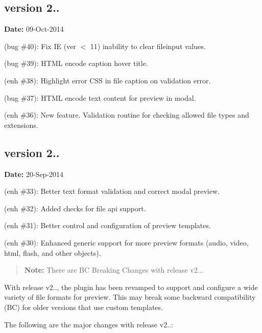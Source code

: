 \subsection*{version 2..}

{\bfseries Date\+:} 09-\/\+Oct-\/2014


\begin{DoxyItemize}
\item (bug \#40)\+: Fix IE (ver $<$ 11) inability to clear fileinput values.
\item (bug \#39)\+: H\+T\+ML encode caption hover title.
\item (enh \#38)\+: Highlight error C\+SS in file caption on validation error.
\item (bug \#37)\+: H\+T\+ML encode text content for preview in modal.
\item (enh \#36)\+: New feature. Validation routine for checking allowed file types and extensions.
\end{DoxyItemize}

\subsection*{version 2..}

{\bfseries Date\+:} 20-\/\+Sep-\/2014


\begin{DoxyItemize}
\item (enh \#33)\+: Better text format validation and correct modal preview.
\item (enh \#32)\+: Added checks for file api support.
\item (enh \#31)\+: Better control and configuration of preview templates.
\item (enh \#30)\+: Enhanced generic support for more preview formats (audio, video, html, flash, and other objects).
\end{DoxyItemize}

\begin{quote}
{\bfseries Note\+:} There are BC Breaking Changes with release v2... \end{quote}


With release v2.., the plugin has been revamped to support and configure a wide variety of file formats for preview. This may break some backward compatibility (BC) for older versions that use custom templates.

The following are the major changes with release v2..\+:


